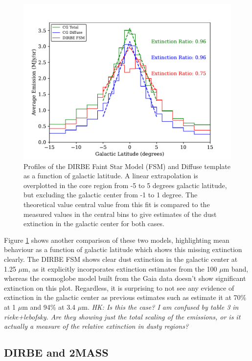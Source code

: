 \documentclass{aa}
\begin{document}
\begin{figure}
\includegraphics[width=\columnwidth]{figs/diffuseTemplate/extinction.pdf}
  \caption{Profiles of the DIRBE Faint Star Model (FSM) and Diffuse template as a function of galactic latitude. A linear extrapolation is overplotted in the core region from -5 to 5 degrees galactic latitude, but excluding the galactic center from -1 to 1 degree. The theoretical value central value from this fit is compared to the measured values in the central bins to give estimates of the dust extinction in the galactic center for both cases.}
  \label{fig:extinction}
\end{figure}

Figure \ref{fig:extinction} shows another comparison of these two models, highlighting mean behaviour as a function of galactic latitude which shows this missing extinction clearly. The DIRBE FSM shows clear dust extinction in the galactic center at 1.25 $\mu$m, as it explicitly incorporates extinction estimates from the 100 $\mu$m band, whereas the cosmoglobe model built from the Gaia data doesn't show significant extinction on this plot. Regardless, it is surprising to not see any evidence of extinction in the galactic center as previous estimates such as \cite{extinction} estimate it at 70\% at 1 $\mu$m and 94\% at 3.4 $\mu$m. \emph{HK: Is this the case? I am confused by table 3 in rieke+lebofsky. Are they showing just the total scaling of the emissions, or is it actually a measure of the relative extinction in dusty regions?}

\subsection{DIRBE and 2MASS}
\end{document}
